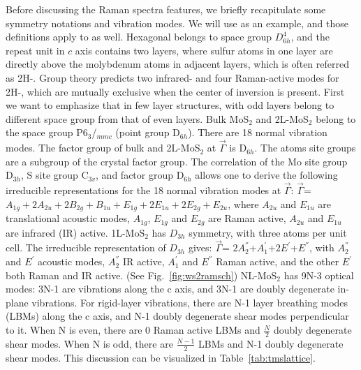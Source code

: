 Before discussing the Raman spectra features, we briefly recapitulate some symmetry notations and vibration modes. We will use  as an example, and those definitions apply to  as well. Hexagonal  belongs to space group $D_{6h}^4$, and the repeat unit in $c$ axis contains two layers, where sulfur atoms in one layer are directly above the molybdenum atoms in adjacent layers, which is often referred as 2H-. Group theory predicts two infrared- and four Raman-active modes for 2H-, which are mutually exclusive when the center of inversion is present. First we want to emphasize that in few layer structures,  with odd layers belong to different space group from that of even layers. Bulk MoS$_2$ and 2L-MoS$_2$ belong to the space group P6$_3$/$_{mmc}$ (point group D$_{6h}$). There are 18 normal vibration modes. The factor group of bulk and 2L-MoS$_2$ at $\vec{\Gamma}$ is D$_{6h}$. The atoms site groups are a subgroup of the crystal factor group. The correlation of the Mo site group D$_{3h}$, S site group C$_{3v}$, and factor group D$_{6h}$ allows one to derive the following irreducible representations for the 18 normal vibration modes at $\vec{\Gamma}$: $\vec{\Gamma}$= $A_{1g}+2A_{2u}+2B_{2g}+B_{1u}+E_{1g}+2E_{1u}+2E_{2g}+E_{2u}$, where $A_{2u}$ and $E_{1u}$ are translational acoustic modes, $A_{1g}$, $E_{1g}$ and $E_{2g}$ are Raman active, $A_{2u}$ and $E_{1u}$ are infrared (IR) active. 1L-MoS$_2$ has $D_{3h}$ symmetry, with three atoms per unit cell. The irreducible representation of $D_{3h}$ gives: $\vec{\Gamma}$= $2A_2^{''}$+$A_1^{'}$+$2E^{'}$+$E^{''}$, with $A_2^{''}$ and $E^{'}$ acoustic modes, $A_2^{''}$ IR active, $A_1^{'}$ and $E^{''}$ Raman active, and the other $E^{'}$ both Raman and IR active. (See Fig.~\ref{fig:ws2ramsch}) NL-MoS$_2$ has 9N-3 optical modes: 3N-1 are vibrations along the c axis, and 3N-1 are doubly degenerate in-plane vibrations. For rigid-layer vibrations, there are N-1 layer breathing modes (LBMs) along the c axis, and N-1 doubly degenerate shear modes perpendicular to it. When N is even, there are 0 Raman active LBMs and $\frac{N}{2}$ doubly degenerate shear modes. When N is odd, there are $\frac{N-1}{2}$ LBMs and N-1 doubly degenerate shear modes.\cite{Wieting1971,Zhang2013i} This discussion can be visualized in Table~\ref{tab:tmslattice}.


